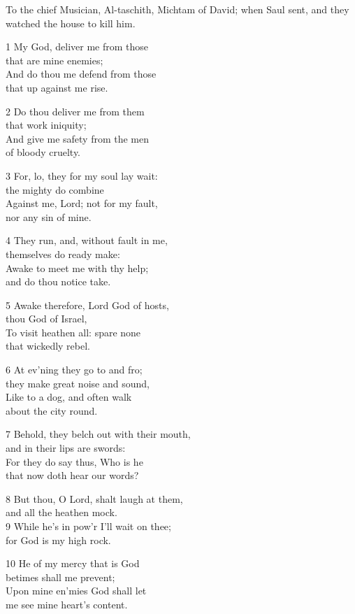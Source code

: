 To the chief Musician, Al-taschith, Michtam of David;
when Saul sent, and they watched the house to kill him.

1 My God, deliver me from those\\
that are mine enemies;\\
And do thou me defend from those\\
that up against me rise.

2 Do thou deliver me from them\\
that work iniquity;\\
And give me safety from the men\\
of bloody cruelty.

3 For, lo, they for my soul lay wait:\\
the mighty do combine\\
Against me, Lord; not for my fault,\\
nor any sin of mine.

4 They run, and, without fault in me,\\
themselves do ready make:\\
Awake to meet me with thy help;\\
and do thou notice take.

5 Awake therefore, Lord God of hosts,\\
thou God of Israel,\\
To visit heathen all: spare none\\
that wickedly rebel.

6 At ev’ning they go to and fro;\\
they make great noise and sound,\\
Like to a dog, and often walk\\
about the city round.

7 Behold, they belch out with their mouth,\\
and in their lips are swords:\\
For they do say thus, Who is he\\
that now doth hear our words?

8 But thou, O Lord, shalt laugh at them,\\
and all the heathen mock.\\
9 While he’s in pow’r I’ll wait on thee;\\
for God is my high rock.

10 He of my mercy that is God\\
betimes shall me prevent;\\
Upon mine en’mies God shall let\\
me see mine heart’s content.

